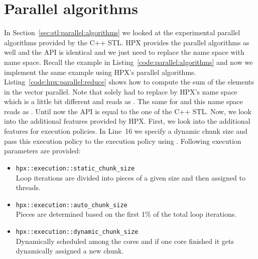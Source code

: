 \section{Parallel algorithms}
\label{sec:hpx:parallel:algorithms}
In Section~\ref{sec:stl:parallel:algorithms} we looked at the experimental parallel algorithms provided by the C++ STL. HPX provides the parallel algorithms as well and the API is identical and we just need to replace the  name space with  name space. Recall the example in Listing~\ref{code:parallel:algorithms} and now we implement the same example using HPX's parallel algorithms. Listing~\ref{code:hpx:parallel:reduce} shows how to compute the sum of the elements in the vector  parallel. Note that solely had to replace  by HPX's name space which is a little bit different and reads as . The same for  and this name space reads as . Until now the API is equal to the one of the C++ STL. Now, we look into the additional features provided by HPX. First, we look into the additional features for execution policies. In Line~16 we specify a dynamic chunk size  and pass this execution policy to the execution policy using . Following execution parameters are provided:
\vspace{0.25cm}
\begin{itemize}
\item \lstinline|hpx::execution::static_chunk_size| \\
Loop iterations are divided into pieces of a given size and then assigned to threads.
\item \lstinline|hpx::execution::auto_chunk_size| \\
Pieces are determined based on the first 1\% of the total loop iterations. 
\item \lstinline|hpx::execution::dynamic_chunk_size| \\
Dynamically scheduled among the cores and if one core finished it gets dynamically assigned a new chunk.
\end{itemize}

